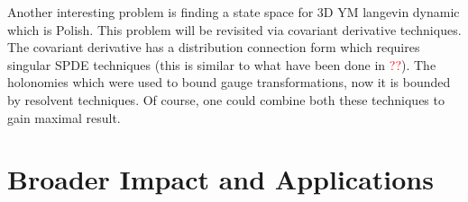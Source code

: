 \documentclass[11pt]{article}
\numberwithin{equation}{section}
\theoremstyle{definition}
\theoremstyle{remark}
\newcommand{\1}{\mathbf 1}
\newcommand{\<}{\langle}
\renewcommand{\>}{\rangle}
\newcommand{\red}[1]{\textcolor{red}{#1}}
\begin{document}
Another interesting problem is finding a state space for 3D YM langevin dynamic which is Polish. This problem will be revisited via covariant derivative techniques. The covariant derivative has a distribution connection form which requires singular SPDE techniques (this is similar to what have been done in \red{??}). The holonomies which were used to bound gauge transformations, now it is bounded by resolvent techniques. Of course, one could combine both these techniques to gain maximal result.
 


\section{Broader Impact and Applications}
\end{document}
